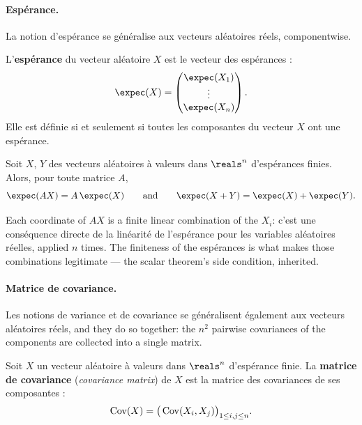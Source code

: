 \paragraph{Espérance.}

La notion d'espérance se généralise aux vecteurs aléatoires réels, componentwise.

\begin{definition}
  L'\textbf{espérance} du vecteur aléatoire $X$ est le vecteur des espérances :
  \[
    \expec(X) = \begin{pmatrix} \expec(X_{1}) \\ \vdots \\ \expec(X_{n}) \end{pmatrix}.
  \]
  Elle est définie si et seulement si toutes les composantes du vecteur $X$ ont
  une espérance.
\end{definition}

\begin{prop}
  Soit $X$, $Y$ des vecteurs aléatoires à valeurs dans $\reals^{n}$ d'espérances
  finies. Alors, pour toute matrice $A$,
  \[
    \expec(AX) = A\,\expec(X)
    \qquad\text{and}\qquad
    \expec(X+Y) = \expec(X)+\expec(Y).
  \]
\end{prop}

\begin{remark}
  Each coordinate of $AX$ is a finite linear combination of the $X_{i}$: c'est une
  conséquence directe de la linéarité de l'espérance pour les variables
  aléatoires réelles, applied $n$ times. The finiteness of the espérances is what
  makes those combinations legitimate --- the scalar theorem's side condition,
  inherited.
\end{remark}

\paragraph{Matrice de covariance.}

Les notions de variance et de covariance se généralisent également aux vecteurs
aléatoires réels, and they do so together: the $n^{2}$ pairwise covariances of the
components are collected into a single matrix.

\begin{definition}
  Soit $X$ un vecteur aléatoire à valeurs dans $\reals^{n}$ d'espérance finie. La
  \textbf{matrice de covariance} (\textit{covariance matrix}) de $X$ est la
  matrice des covariances de ses composantes :
  \[
    \operatorname{Cov}(X) = \big(\operatorname{Cov}(X_{i},X_{j})\big)_{1 \leq i,j \leq n}.
  \]
\end{definition}

